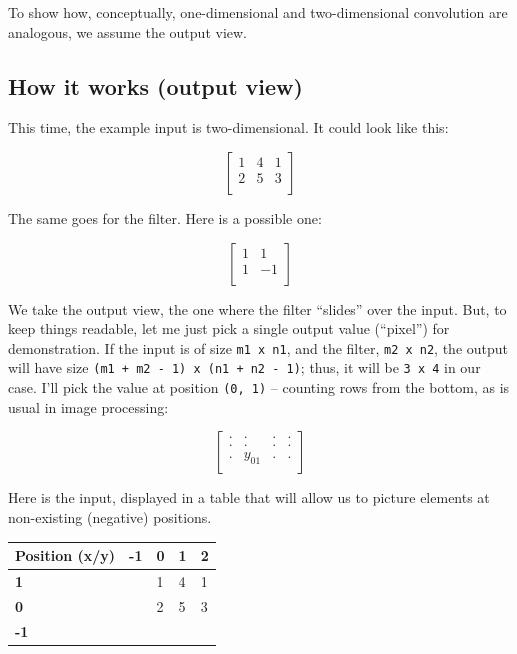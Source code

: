 \documentclass[
  letterpaper,
]{krantz}
\begin{document}
To show how, conceptually, one-dimensional and two-dimensional
convolution are analogous, we assume the output view.

\hypertarget{how-it-works-output-view}{%
\subsection{How it works (output view)}\label{how-it-works-output-view}}

This time, the example input is two-dimensional. It could look like
this:

\[
\begin{bmatrix}
  1 & 4 & 1\\
  2 & 5 & 3\\
\end{bmatrix}
\]

The same goes for the filter. Here is a possible one:

\[
\begin{bmatrix}
  1 & 1\\
  1 & -1\\
\end{bmatrix}
\]

We take the output view, the one where the filter ``slides'' over the
input. But, to keep things readable, let me just pick a single output
value (``pixel'') for demonstration. If the input is of size
\texttt{m1\ x\ n1}, and the filter, \texttt{m2\ x\ n2}, the output will
have size \texttt{(m1\ +\ m2\ -\ 1)\ x\ (n1\ +\ n2\ -\ 1)}; thus, it
will be \texttt{3\ x\ 4} in our case. I'll pick the value at position
\texttt{(0,\ 1)} -- counting rows from the bottom, as is usual in image
processing:

\[
\begin{bmatrix}
  . & . & . & .\\
  . & . & . & .\\
  . & y_{01} & . & .\\
\end{bmatrix}
\]

Here is the input, displayed in a table that will allow us to picture
elements at non-existing (negative) positions.

\begin{longtable}[]{@{}lllll@{}}
\toprule\noalign{}
Position (x/y) & -1 & 0 & 1 & 2 \\
\midrule\noalign{}
\endhead
\bottomrule\noalign{}
\endlastfoot
\textbf{1} & & 1 & 4 & 1 \\
\textbf{0} & & 2 & 5 & 3 \\
\textbf{-1} & & & & \\
\end{longtable}
\end{document}
